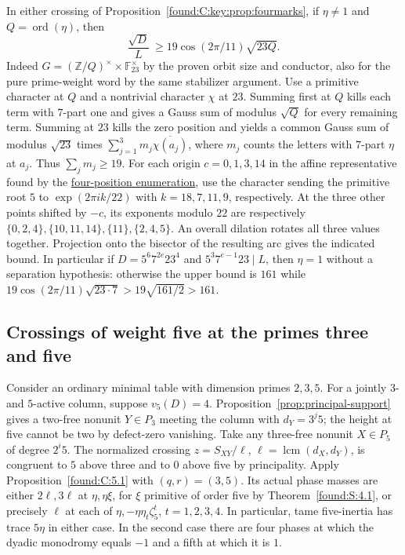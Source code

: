 \documentclass[11pt,a4paper]{article}
\numberwithin{equation}{section}
\theoremstyle{remark}
\begin{document}
In either crossing of Proposition~\ref{found:C:key:prop:fourmarks}, if
$\eta\ne1$ and $Q=\operatorname{ord}(\eta)$, then
\[
 \frac{\sqrt D}{L}\ \ge 19\cos(2\pi/11)\sqrt{23Q}.
\]
Indeed $G=(\mathbb Z/Q)^\times\times\mathbb F_{23}^{\times}$
by the proven orbit size and conductor, also for the pure prime-weight
word by the same stabilizer argument. Use a primitive character at $Q$
and a nontrivial character $\chi$ at $23$. Summing first at $Q$
kills each term with $7$-part one and gives a Gauss sum of modulus
$\sqrt Q$ for every remaining term. Summing at $23$ kills the zero
position and yields a common Gauss sum of modulus $\sqrt{23}$ times
$\sum_{j=1}^3 m_j\overline{\chi(a_j)}$, where $m_j$ counts the
letters with $7$-part $\eta$ at $a_j$. Thus $\sum_jm_j\ge19$.
For each origin $c=0,1,3,14$ in the affine representative found by the
\href{https://github.com/sebastienpalcoux/WGT-fusion-categories/blob/f7f9f9a02f3116e61eb9dca4eebfed77001494e8/code/word_closure.py}{four-position enumeration}, use the character sending the primitive root $5$
to $\exp(2\pi i k/22)$ with $k=18,7,11,9$, respectively. At the
three other points shifted by $-c$, its exponents modulo $22$
are respectively
$\{0,2,4\},\{10,11,14\},\{11\},\{2,4,5\}$.
An overall dilation rotates all three values together. Projection
onto the bisector of the resulting arc gives the indicated bound.
In particular if $D=5^6 7^{2e}23^4$ and
$5^3 7^{e-1}23\mid L$, then $\eta=1$ without a separation
hypothesis: otherwise the upper bound is $161$ while
$19\cos(2\pi/11)\sqrt{23\cdot7}>
19\sqrt{161/2}>161$.

\subsection{Crossings of weight five at the primes three and five}\label{sec:weight-five-crossing}

Consider an ordinary minimal table with dimension primes $2,3,5$. For a jointly $3$- and $5$-active
column, suppose $v_5(D)=4$. Proposition~\ref{prop:principal-support} gives a two-free nonunit
$Y\in P_3$ meeting the column with $d_Y=3^j5$; the height at five
cannot be two by defect-zero vanishing. Take any three-free nonunit
$X\in P_5$ of degree $2^i5$. The normalized crossing
$z=S_{XY}/\ell$, $\ell=\operatorname{lcm}(d_X,d_Y)$, is congruent to $5$ above three and to $0$ above five by principality. Apply Proposition~\ref{found:C:5.1} with $(q,r)=(3,5)$. Its actual phase masses are either
$2\ell,3\ell$ at $\eta,\eta\xi$, for $\xi$ primitive of order five
by Theorem~\ref{found:S:4.1}, or precisely $\ell$ at each of
$\eta,-\eta\eta_t\zeta_5^t$, $t=1,2,3,4$. In particular, tame
five-inertia has trace $5\eta$ in either case. In the second case
there are four phases at which the dyadic monodromy equals $-1$ and
a fifth at which it is $1$.
\end{document}
